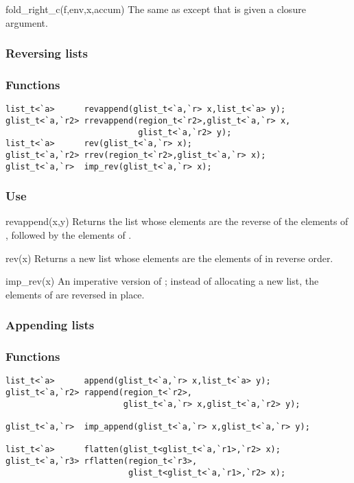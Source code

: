 \begin{defun}{fold_right_c}{(f,env,x,accum)}
The same as  except that  is given a closure
argument.
\end{defun}


\subsubsection*{Reversing lists}
\subsubsection*{Functions}
\begin{verbatim}
list_t<`a>      revappend(glist_t<`a,`r> x,list_t<`a> y);
glist_t<`a,`r2> rrevappend(region_t<`r2>,glist_t<`a,`r> x,
                           glist_t<`a,`r2> y);
list_t<`a>      rev(glist_t<`a,`r> x);
glist_t<`a,`r2> rrev(region_t<`r2>,glist_t<`a,`r> x);
glist_t<`a,`r>  imp_rev(glist_t<`a,`r> x);
\end{verbatim}

\subsubsection*{Use}

\begin{defun}{revappend}{(x,y)}
Returns the list whose elements are the reverse of the elements of
, followed by the elements of .
\end{defun}

\begin{defun}{rev}{(x)}
Returns a new list whose elements are the elements of  in reverse
order.
\end{defun}

\begin{defun}{imp_rev}{(x)}
An imperative version of ; instead of allocating a new
list, the elements of  are reversed in place.
\end{defun}

\subsubsection*{Appending lists}
\subsubsection*{Functions}
\begin{verbatim}
list_t<`a>      append(glist_t<`a,`r> x,list_t<`a> y);
glist_t<`a,`r2> rappend(region_t<`r2>,
                        glist_t<`a,`r> x,glist_t<`a,`r2> y);

glist_t<`a,`r>  imp_append(glist_t<`a,`r> x,glist_t<`a,`r> y);

list_t<`a>      flatten(glist_t<glist_t<`a,`r1>,`r2> x);
glist_t<`a,`r3> rflatten(region_t<`r3>,
                         glist_t<glist_t<`a,`r1>,`r2> x);
\end{verbatim}

